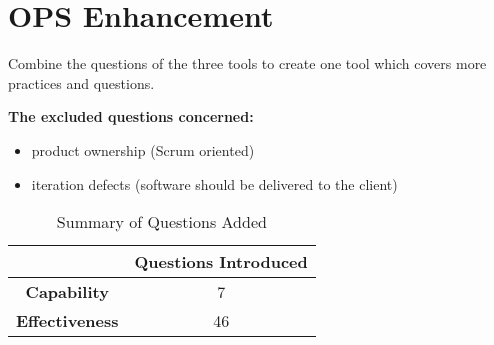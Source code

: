 \section{OPS Enhancement}

Combine the questions of the three tools to create one tool which covers more practices and questions.

\textbf{The excluded questions concerned:}

\begin{itemize}
	\item product ownership (Scrum oriented)
	\item iteration defects (software should be delivered to the client)
\end{itemize}

\begin{table} [H]
\centering
	\begin{tabular}{| c | c |} \hline
		  & \textbf{Questions Introduced} \\ \hline
		 \textbf{Capability} & 7 \\ \hline
		 \textbf{Effectiveness} & 46 \\ \hline
	\end{tabular}
	\caption{Summary of Questions Added}
\end{table}

\clearpage